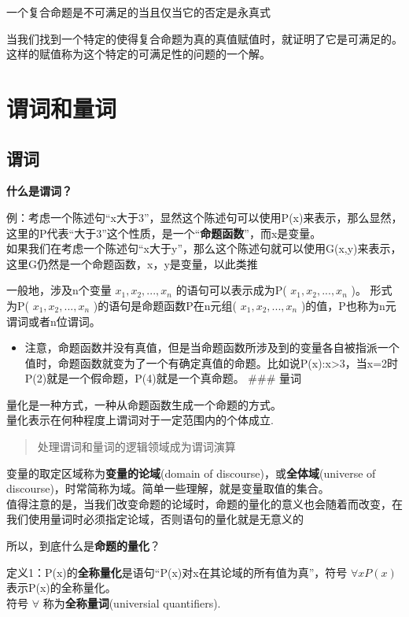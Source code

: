 \documentclass[12pt,a4paper,oneside]{ctexart}
\begin{document}
一个复合命题是不可满足的当且仅当它的否定是永真式

当我们找到一个特定的使得复合命题为真的真值赋值时，就证明了它是可满足的。这样的赋值称为这个特定的可满足性的问题的一个解。

\section*{谓词和量词}

\subsection*{谓词}

\textbf{什么是谓词？}

例：考虑一个陈述句``x大于3''，显然这个陈述句可以使用P(x)来表示，那么显然，这里的P代表``大于3''这个性质，是一个``\textbf{命题函数}''，而x是变量。\\
如果我们在考虑一个陈述句``x大于y''，那么这个陈述句就可以使用G(x,y)来表示，这里G仍然是一个命题函数，x，y是变量，以此类推

一般地，涉及n个变量 \(x_1,x_2,...,x_n\) 的语句可以表示成为P( \(x_1,x_2,...,x_n\) )。 形式为P( \(x_1,x_2,...,x_n\) )的语句是命题函数P在n元组( \(x_1,x_2,...,x_n\) )的值，P也称为n元谓词或者n位谓词。

\begin{itemize}
\item
  注意，命题函数并没有真值，但是当命题函数所涉及到的变量各自被指派一个值时，命题函数就变为了一个有确定真值的命题。比如说P(x):x\textgreater3，当x=2时P(2)就是一个假命题，P(4)就是一个真命题。 \#\#\# 量词
\end{itemize}

量化是一种方式，一种从命题函数生成一个命题的方式。\\
量化表示在何种程度上谓词对于一定范围内的个体成立.

\begin{quote}
处理谓词和量词的逻辑领域成为谓词演算
\end{quote}

变量的取定区域称为\textbf{变量的论域}(domain of discourse)，或\textbf{全体域}(universe of discourse)，时常简称为域。简单一些理解，就是变量取值的集合。\\
值得注意的是，当我们改变命题的论域时，命题的量化的意义也会随着而改变，在我们使用量词时必须指定论域，否则语句的量化就是无意义的

所以，到底什么是\textbf{命题的量化}？

定义1：P(x)的\textbf{全称量化}是语句``P(x)对x在其论域的所有值为真''，符号 \(\forall xP(x)\) 表示P(x)的全称量化。\\
符号 \(\forall\) 称为\textbf{全称量词}(universial quantifiers).
\end{document}
